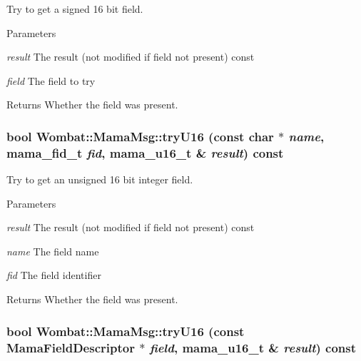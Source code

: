 Try to get a signed 16 bit field. 
\begin{DoxyParams}{Parameters}
\item[{\em result}]The result (not modified if field not present) const \item[{\em field}]The field to try \end{DoxyParams}
\begin{DoxyReturn}{Returns}
Whether the field was present. 
\end{DoxyReturn}
\hypertarget{classWombat_1_1MamaMsg_a2eec8465af21f764f6136bc507c1c4d1}{
\subsubsection[{tryU16}]{\setlength{\rightskip}{0pt plus 5cm}bool Wombat::MamaMsg::tryU16 (const char $\ast$ {\em name}, \/  mama\_\-fid\_\-t {\em fid}, \/  mama\_\-u16\_\-t \& {\em result}) const}}
\label{classWombat_1_1MamaMsg_a2eec8465af21f764f6136bc507c1c4d1}


Try to get an unsigned 16 bit integer field. 
\begin{DoxyParams}{Parameters}
\item[{\em result}]The result (not modified if field not present) const \item[{\em name}]The field name \item[{\em fid}]The field identifier \end{DoxyParams}
\begin{DoxyReturn}{Returns}
Whether the field was present. 
\end{DoxyReturn}
\hypertarget{classWombat_1_1MamaMsg_a950562e88ee2ab3af474868e7127a44c}{
\subsubsection[{tryU16}]{\setlength{\rightskip}{0pt plus 5cm}bool Wombat::MamaMsg::tryU16 (const {\bf MamaFieldDescriptor} $\ast$ {\em field}, \/  mama\_\-u16\_\-t \& {\em result}) const}}
\label{classWombat_1_1MamaMsg_a950562e88ee2ab3af474868e7127a44c}


